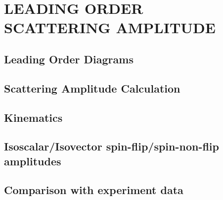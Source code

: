 \chapter{LEADING ORDER SCATTERING AMPLITUDE}

\section{Leading Order Diagrams}
\section{Scattering Amplitude Calculation}
\section{Kinematics}
\section{Isoscalar/Isovector spin-flip/spin-non-flip amplitudes}
\section{Comparison with experiment data}


\newpage